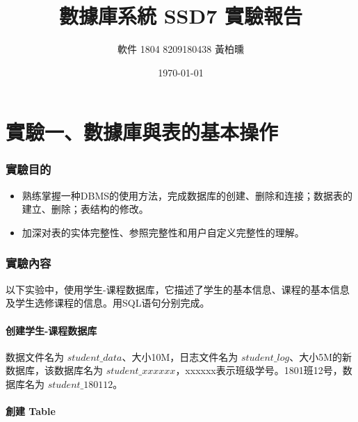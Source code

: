 \documentclass[12pt, a4paper]{report}
\author{軟件 1804 8209180438 黃柏曛}
\date{\today}
\title{數據庫系統 SSD7 實驗報告}
\begin{document}
\maketitle

\tableofcontents

\part{實驗一、數據庫與表的基本操作}

\section{實驗目的}

\begin{itemize}
    \item 熟练掌握一种DBMS的使用方法，完成数据库的创建、删除和连接；数据表的建立、删除；表结构的修改。
    \item 加深对表的实体完整性、参照完整性和用户自定义完整性的理解。
\end{itemize}

\section{實驗內容}

以下实验中，使用学生-课程数据库，它描述了学生的基本信息、课程的基本信息及学生选修课程的信息。用SQL语句分别完成。

\subsection{创建学生-课程数据库}

{数据文件名为 $student\_data$、大小10M，日志文件名为 $student\_log$、大小5M的新数据库，该数据库名为 $student\_xxxxxx$，xxxxxx表示班级学号。1801班12号，数据库名为 $student\_180112$}。

\subsection{創建 Table}

\begin{figure}[H] %
    \centering %
\end{figure}
\end{document}
